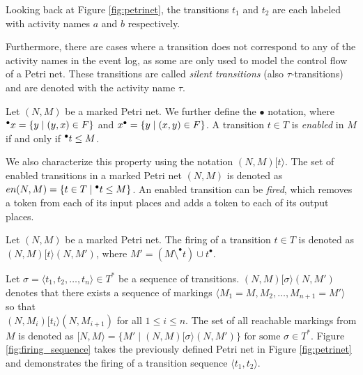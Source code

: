 Looking back at Figure \ref{fig:petrinet}, the transitions $t_1$ and $t_2$ are each labeled with activity names $a$ and $b$ respectively.

Furthermore, there are cases where a transition does not correspond to any of the activity names in the event log, as some are only used to model the control flow of a Petri net. These transitions are called \emph{silent transitions} (also $\tau$-transitions) and are denoted with the activity name $\tau$.

\begin{definition}
    Let $(N, M)$ be a marked Petri net.  We further define the $\bullet$ notation, where ${^{\bullet}x} = \{ y \mid (y, x) \in F \}$ and $x^{\bullet}= \{ y \mid (x, y) \in F \}$. A transition $t \in T$ is \emph{enabled} in $M$ if and only if ${^{\bullet}t} \leq M$.
\end{definition}

We also characterize this property using the notation $(N, M)[t\rangle$. The set of enabled transitions in a marked Petri net $(N, M)$ is denoted as $en(N, M) = \{ t \in T \mid {^{\bullet}t} \leq M \}$. An enabled transition can be \emph{fired}, which removes a token from each of its input places and adds a token to each of its output places.

\begin{definition}
    Let $(N, M)$ be a marked Petri net. The firing of a transition $t \in T$ is denoted as $(N, M) [t\rangle (N, M')$, where $M' = (M \setminus ^{\bullet}t) \cup t^{\bullet}$.
\end{definition}

Let $\sigma = \langle t_1, t_2, \dots, t_n \rangle \in T^*$ be a sequence of transitions. $(N, M)[\sigma \rangle (N, M')$ denotes that there exists a sequence of markings $\langle M_1 = M, M_2, \dots, M_{n+1} = M' \rangle$ so that \\ $(N, M_i)[t_i \rangle (N, M_{i+1})$ for all $1 \leq i \leq n$. The set of all reachable markings from $M$ is denoted as $[N, M\rangle = \{ M' \mid (N, M) [\sigma\rangle (N, M') \} \text{ for some } \sigma \in T^*$. Figure \ref{fig:firing_sequence} takes the previously defined Petri net in Figure \ref{fig:petrinet} and demonstrates the firing of a transition sequence $\langle t_1, t_2 \rangle$.

